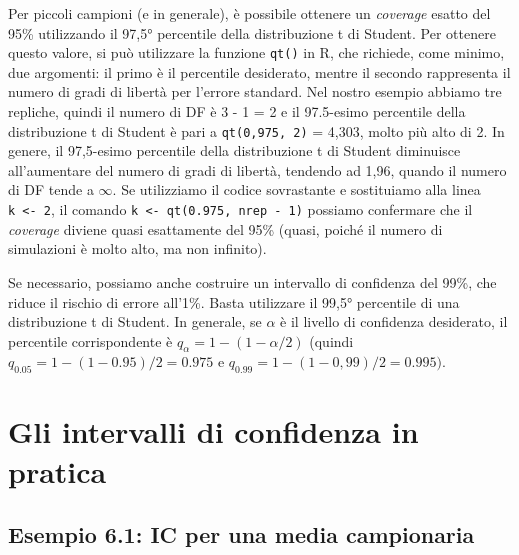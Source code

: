 \documentclass[
  12pt,
]{book}
\begin{document}
Per piccoli campioni (e in generale), è possibile ottenere un \emph{coverage} esatto del 95\% utilizzando il 97,5° percentile della distribuzione t di Student. Per ottenere questo valore, si può utilizzare la funzione \texttt{qt()} in R, che richiede, come minimo, due argomenti: il primo è il percentile desiderato, mentre il secondo rappresenta il numero di gradi di libertà per l'errore standard. Nel nostro esempio abbiamo tre repliche, quindi il numero di DF è 3 - 1 = 2 e il 97.5-esimo percentile della distribuzione t di Student è pari a \texttt{qt(0,975,\ 2)} = 4,303, molto più alto di 2. In genere, il 97,5-esimo percentile della distribuzione t di Student diminuisce all'aumentare del numero di gradi di libertà, tendendo ad 1,96, quando il numero di DF tende a \(\infty\). Se utilizziamo il codice sovrastante e sostituiamo alla linea \texttt{k\ \textless{}-\ 2}, il comando \texttt{k\ \textless{}-\ qt(0.975,\ nrep\ -\ 1)} possiamo confermare che il \emph{coverage} diviene quasi esattamente del 95\% (quasi, poiché il numero di simulazioni è molto alto, ma non infinito).

Se necessario, possiamo anche costruire un intervallo di confidenza del 99\%, che riduce il rischio di errore all'1\%. Basta utilizzare il 99,5° percentile di una distribuzione t di Student. In generale, se \(\alpha\) è il livello di confidenza desiderato, il percentile corrispondente è \(q_{\alpha} = 1 - (1 - \alpha/2)\) (quindi \(q_{0.05} = 1-(1-0.95)/2=0.975\) e \(q_{0.99} =1-(1-0,99)/2=0.995)\).

\hypertarget{gli-intervalli-di-confidenza-in-pratica}{%
\section{Gli intervalli di confidenza in pratica}\label{gli-intervalli-di-confidenza-in-pratica}}

\hypertarget{esempio-6.1-ic-per-una-media-campionaria}{%
\subsection{Esempio 6.1: IC per una media campionaria}\label{esempio-6.1-ic-per-una-media-campionaria}}
\end{document}
